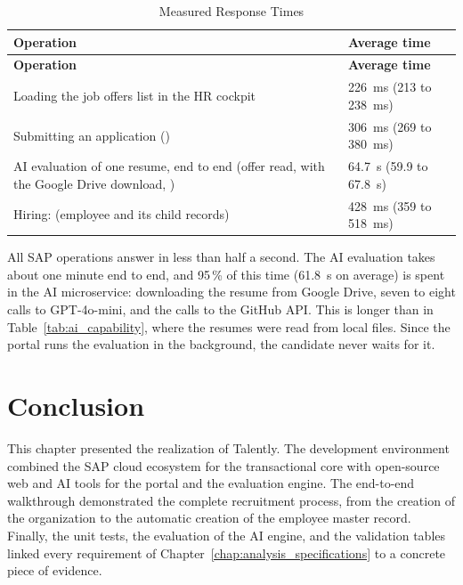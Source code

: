 \begingroup
\linespread{1}\selectfont
\renewcommand{\arraystretch}{1.4}
\begin{longtable}{@{}F{12.5cm}F{5cm}@{}}
\caption{Measured Response Times}\label{tab:performance}\\
\toprule
\textbf{Operation} & \textbf{Average time} \\
\midrule
\endfirsthead
\toprule
\textbf{Operation} & \textbf{Average time} \\
\midrule
\endhead
\bottomrule
\endlastfoot
Loading the job offers list in the HR cockpit & 226~ms (213 to 238~ms) \\
Submitting an application () & 306~ms (269 to 380~ms) \\
AI evaluation of one resume, end to end (offer read,  with the Google Drive download, ) & 64.7~s (59.9 to 67.8~s) \\
Hiring:  (employee and its child records) & 428~ms (359 to 518~ms) \\
\end{longtable}
\endgroup

All SAP operations answer in less than half a second. The AI evaluation takes about one minute end to end, and 95\,\% of this time (61.8~s on average) is spent in the AI microservice: downloading the resume from Google Drive, seven to eight calls to GPT-4o-mini, and the calls to the GitHub API. This is longer than in Table~\ref{tab:ai_capability}, where the resumes were read from local files. Since the portal runs the evaluation in the background, the candidate never waits for it.

\section*{Conclusion}

This chapter presented the realization of Talently. The development environment combined the SAP cloud ecosystem for the transactional core with open-source web and AI tools for the portal and the evaluation engine. The end-to-end walkthrough demonstrated the complete recruitment process, from the creation of the organization to the automatic creation of the employee master record. Finally, the unit tests, the evaluation of the AI engine, and the validation tables linked every requirement of Chapter~\ref{chap:analysis_specifications} to a concrete piece of evidence.

\fussy
